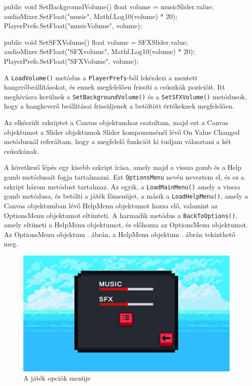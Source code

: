 \begin{java}
public void SetBackgroundVolume()
{
    float volume = musicSlider.value;
    audioMixer.SetFloat("music",
        Mathf.Log10(volume) * 20);
    PlayerPrefs.SetFloat("musicVolume", volume);
}

public void SetSFXVolume()
{
    float volume = SFXSlider.value;
    audioMixer.SetFloat("SFXvolume", 
        Mathf.Log10(volume) * 20);
    PlayerPrefs.SetFloat("SFXVolume", volume);
}
\end{java}

A \texttt{LoadVolume()} metódus a \texttt{PlayerPrefs}-ből lekérdezi a mentett hangerőbeállításokat, és ennek megfelelően frissíti a csúszkák pozícióit. Itt meghívásra kerülnek a \texttt{SetBackgroundVolume()} és a \texttt{SetSFXVolume()} metódusok, hogy a hangkeverő beállításai frissüljenek a betöltött értékeknek megfelelően.

Az elkészült szkriptet a Canvas objektumhoz csatoltam, majd ezt a Canvas objektumot a Slider objektumok Slider komponensénél lévő On Value Changed metódusnál referáltam, hogy a megfelelő funkciót ki tudjam választani a két csúszkának.

A következő lépés egy kisebb szkript írása, amely majd a vissza gomb és a Help gomb metódusait fogja tartalmazni. Ezt \texttt{OptionsMenu} nevén neveztem el, és ez a szkript három metódust tartalmaz. Az egyik, a \texttt{LoadMainMenu()} amely a vissza gomb metódusa, és betölti a játék főmenüjet, a másik a \texttt{LoadHelpMenu()}, amely a Canvas objektumban lévő HelpMenu objektumot hozza elő, valamint az OptionsMenu objektumot eltünteti. A harmadik metódus a \texttt{BackToOptions()}, amely eltüneti a HelpMenu objektumot, és előhozza az OptionsMenu objektumot. 
\newpage
Az OptionsMenu objektum . ábrán, a HelpMenu objektum . ábrán tekinthető meg.

\begin{figure}[ht]
\centering
\includegraphics[width =0.9 \textwidth]{images/optionsmenu}
\caption{A játék opciók menüje}
\label{fig:optionsmenu}
\end{figure}

